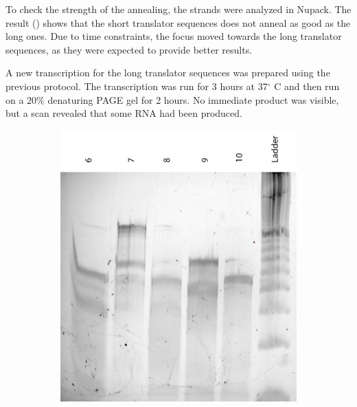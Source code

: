To check the strength of the annealing, the strands were analyzed in Nupack. The result () shows that the short translator sequences does not anneal as good as the long ones. Due to time constraints, the focus moved towards the long translator sequences, as they were expected to provide better results.

A new transcription for the long translator sequences was prepared using the previous protocol. The transcription was run for 3 hours at 37$^\circ$ C and then run on a 20\% denaturing PAGE gel for 2 hours. No immediate product was visible, but a scan revealed that some RNA had been produced.

\begin{figure}[h]
\begin{subfigure}[t]{0.51\textwidth}
  \includegraphics[width=\textwidth]{images/translator_transcription_long_1.png}
  \caption{}
  \label{translator_transcription_long_1}
\end{subfigure}
\begin{subfigure}[t]{0.49\textwidth}

\end{subfigure}
\end{figure}
